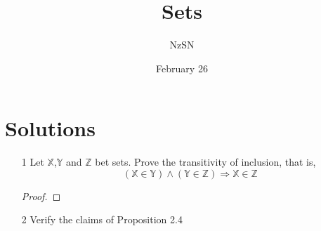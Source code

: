 \documentclass[11pt]{book}
\title{Sets}
\author{NzSN}
\date{February 26}
\newcommand{\bb}[1]{\mathbb{#1}}
\newcommand{\Ra}{\Rightarrow}
\begin{document}
\maketitle

\vspace{0.2 cm}
\section{Solutions}

\begin{enumerate}
\item[1]
        Let $\bb{X}$,$\bb{Y}$ and $\bb{Z}$ bet sets.
        Prove the transitivity of inclusion, that is,
        $$(\bb{X} \in \bb{Y}) \land (\bb{Y} \in \bb{Z}) \Ra \bb{X} \in \bb{Z}$$
\begin{proof}

\end{proof}


\item [2]
        Verify the claims of Proposition 2.4
\end{enumerate}
\end{document}
